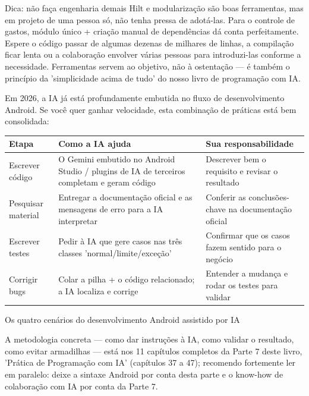 \begin{tcbinfo}{Dica: não faça engenharia demais}
Hilt e modularização são boas ferramentas, mas em projeto de uma pessoa só, não tenha pressa de adotá-las. Para o controle de gastos, módulo único + criação manual de dependências dá conta perfeitamente. Espere o código passar de algumas dezenas de milhares de linhas, a compilação ficar lenta ou a colaboração envolver várias pessoas para introduzi-las conforme a necessidade. Ferramentas servem ao objetivo, não à ostentação — é também o princípio da 'simplicidade acima de tudo' do nosso livro de programação com IA.

\end{tcbinfo}


Em 2026, a IA já está profundamente embutida no fluxo de desenvolvimento Android. Se você quer ganhar velocidade, esta combinação de práticas está bem consolidada:

\begin{center}
\begin{tabularx}{\linewidth}{|X|X|X|}
\hline
\textbf{Etapa} & \textbf{Como a IA ajuda} & \textbf{Sua responsabilidade} \tabularnewline
\hline
Escrever código & O Gemini embutido no Android Studio / plugins de IA de terceiros completam e geram código & Descrever bem o requisito e revisar o resultado \tabularnewline
Pesquisar material & Entregar a documentação oficial e as mensagens de erro para a IA interpretar & Conferir as conclusões-chave na documentação oficial \tabularnewline
Escrever testes & Pedir à IA que gere casos nas três classes 'normal/limite/exceção' & Confirmar que os casos fazem sentido para o negócio \tabularnewline
Corrigir bugs & Colar a pilha + o código relacionado; a IA localiza e corrige & Entender a mudança e rodar os testes para validar \tabularnewline
\hline
\end{tabularx}
\end{center}

\begin{center}\small\color{gray}Os quatro cenários do desenvolvimento Android assistido por IA\end{center}

A metodologia concreta — como dar instruções à IA, como validar o resultado, como evitar armadilhas — está nos 11 capítulos completos da Parte 7 deste livro, 'Prática de Programação com IA' (capítulos 37 a 47); recomendo fortemente ler em paralelo: deixe a sintaxe Android por conta desta parte e o know-how de colaboração com IA por conta da Parte 7.

